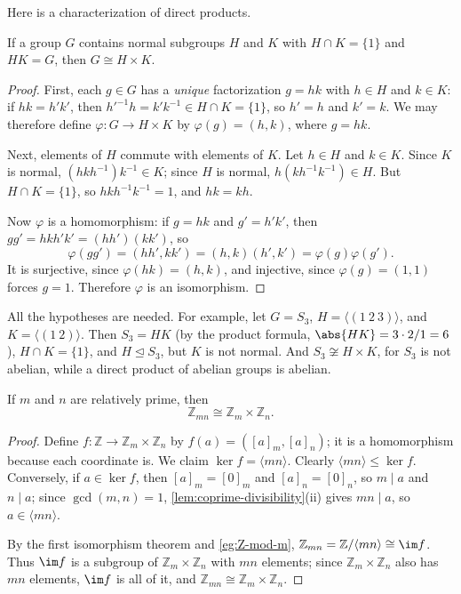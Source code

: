 Here is a characterization of direct products.

\begin{proposition}\label{prop:internal-direct}
	If a group \(G\) contains normal subgroups \(H\) and \(K\) with \(H \cap K = \{1\}\) and
	\(HK = G\), then \(G \cong H \times K\).
\end{proposition}

\begin{proof}
	First, each \(g \in G\) has a \emph{unique} factorization \(g = hk\) with \(h \in H\) and
	\(k \in K\): if \(hk = h'k'\), then \(h'^{-1}h = k'k^{-1} \in H \cap K = \{1\}\), so
	\(h' = h\) and \(k' = k\). We may therefore define \(\varphi\colon G \to H \times K\) by
	\(\varphi(g) = (h, k)\), where \(g = hk\).

	Next, elements of \(H\) commute with elements of \(K\). Let \(h \in H\) and \(k \in K\).
	Since \(K\) is normal, \((hkh^{-1})k^{-1} \in K\); since \(H\) is normal,
	\(h(kh^{-1}k^{-1}) \in H\). But \(H \cap K = \{1\}\), so \(hkh^{-1}k^{-1} = 1\), and
	\(hk = kh\).

	Now \(\varphi\) is a homomorphism: if \(g = hk\) and \(g' = h'k'\), then
	\(gg' = hkh'k' = (hh')(kk')\), so
	\[
		\varphi(gg') = (hh', kk') = (h, k)(h', k') = \varphi(g)\varphi(g').
	\]
	It is surjective, since \(\varphi(hk) = (h, k)\), and injective, since
	\(\varphi(g) = (1, 1)\) forces \(g = 1\). Therefore \(\varphi\) is an isomorphism.
\end{proof}

All the hypotheses are needed. For example, let \(G = S_3\), \(H = \langle(1\ 2\ 3)\rangle\),
and \(K = \langle(1\ 2)\rangle\). Then \(S_3 = HK\) (by the product formula,
\(\abs{HK} = 3 \cdot 2 / 1 = 6\)), \(H \cap K = \{1\}\), and \(H \trianglelefteq S_3\), but
\(K\) is not normal. And \(S_3 \not\cong H \times K\), for \(S_3\) is not abelian, while a
direct product of abelian groups is abelian.

\begin{theorem}\label{thm:Zmn}
	If \(m\) and \(n\) are relatively prime, then
	\[
		\mathbb Z_{mn} \cong \mathbb Z_m \times \mathbb Z_n.
	\]
\end{theorem}

\begin{proof}
	Define \(f\colon \mathbb Z \to \mathbb Z_m \times \mathbb Z_n\) by
	\(f(a) = ([a]_m, [a]_n)\); it is a homomorphism because each coordinate is. We claim
	\(\ker f = \langle mn\rangle\). Clearly \(\langle mn\rangle \leq \ker f\). Conversely, if
	\(a \in \ker f\), then \([a]_m = [0]_m\) and \([a]_n = [0]_n\), so \(m \mid a\) and
	\(n \mid a\); since \(\gcd(m, n) = 1\), \autoref{lem:coprime-divisibility}(ii) gives
	\(mn \mid a\), so \(a \in \langle mn\rangle\).

	By the first isomorphism theorem and \autoref{eg:Z-mod-m},
	\(\mathbb Z_{mn} = \mathbb Z/\langle mn\rangle \cong \im f\). Thus \(\im f\) is a
	subgroup of \(\mathbb Z_m \times \mathbb Z_n\) with \(mn\) elements; since
	\(\mathbb Z_m \times \mathbb Z_n\) also has \(mn\) elements, \(\im f\) is all of it,
	and \(\mathbb Z_{mn} \cong \mathbb Z_m \times \mathbb Z_n\).
\end{proof}

